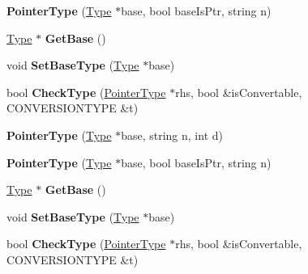 \begin{DoxyCompactItemize}
\item 
\hypertarget{classPointerType_a58dbecb35ecd7ba2901db09aba00dcc7}{{\bfseries Pointer\-Type} (\hyperlink{classType}{Type} $\ast$base, bool base\-Is\-Ptr, string n)}\label{classPointerType_a58dbecb35ecd7ba2901db09aba00dcc7}

\item 
\hypertarget{classPointerType_acfdee349a0e18abd304f85d0b6d951ff}{\hyperlink{classType}{Type} $\ast$ {\bfseries Get\-Base} ()}\label{classPointerType_acfdee349a0e18abd304f85d0b6d951ff}

\item 
\hypertarget{classPointerType_abfb4082aafcedbe8660cfadabbe79f18}{void {\bfseries Set\-Base\-Type} (\hyperlink{classType}{Type} $\ast$base)}\label{classPointerType_abfb4082aafcedbe8660cfadabbe79f18}

\item 
\hypertarget{classPointerType_a01b7271726a3f891c9556cbbab3a4410}{bool {\bfseries Check\-Type} (\hyperlink{classPointerType}{Pointer\-Type} $\ast$rhs, bool \&is\-Convertable, C\-O\-N\-V\-E\-R\-S\-I\-O\-N\-T\-Y\-P\-E \&t)}\label{classPointerType_a01b7271726a3f891c9556cbbab3a4410}

\item 
\hypertarget{classPointerType_acb7c1bf4a82371e46d133a1471d1e3f3}{{\bfseries Pointer\-Type} (\hyperlink{classType}{Type} $\ast$base, string n, int d)}\label{classPointerType_acb7c1bf4a82371e46d133a1471d1e3f3}

\item 
\hypertarget{classPointerType_a58dbecb35ecd7ba2901db09aba00dcc7}{{\bfseries Pointer\-Type} (\hyperlink{classType}{Type} $\ast$base, bool base\-Is\-Ptr, string n)}\label{classPointerType_a58dbecb35ecd7ba2901db09aba00dcc7}

\item 
\hypertarget{classPointerType_acfdee349a0e18abd304f85d0b6d951ff}{\hyperlink{classType}{Type} $\ast$ {\bfseries Get\-Base} ()}\label{classPointerType_acfdee349a0e18abd304f85d0b6d951ff}

\item 
\hypertarget{classPointerType_abfb4082aafcedbe8660cfadabbe79f18}{void {\bfseries Set\-Base\-Type} (\hyperlink{classType}{Type} $\ast$base)}\label{classPointerType_abfb4082aafcedbe8660cfadabbe79f18}

\item 
\hypertarget{classPointerType_a01b7271726a3f891c9556cbbab3a4410}{bool {\bfseries Check\-Type} (\hyperlink{classPointerType}{Pointer\-Type} $\ast$rhs, bool \&is\-Convertable, C\-O\-N\-V\-E\-R\-S\-I\-O\-N\-T\-Y\-P\-E \&t)}\label{classPointerType_a01b7271726a3f891c9556cbbab3a4410}


\end{DoxyCompactItemize}
